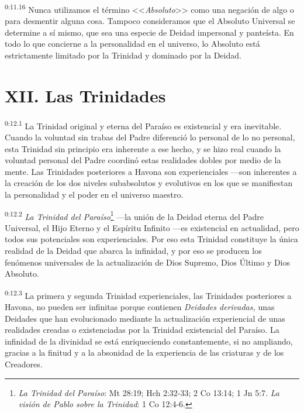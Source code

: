 \par
\textsuperscript{0:11.16} Nunca utilizamos el término <<\textit{Absoluto}>> como una negación de algo o para desmentir alguna cosa. Tampoco consideramos que el Absoluto Universal se determine a sí mismo, que sea una especie de Deidad impersonal y panteísta. En todo lo que concierne a la personalidad en el universo, lo Absoluto está estrictamente limitado por la Trinidad y dominado por la Deidad.

\section*{XII. Las Trinidades}
\par
\textsuperscript{0:12.1} La Trinidad original y eterna del Paraíso es existencial y era inevitable. Cuando la voluntad sin trabas del Padre diferenció lo personal de lo no personal, esta Trinidad sin principio era inherente a ese hecho, y se hizo real cuando la voluntad personal del Padre coordinó estas realidades dobles por medio de la mente. Las Trinidades posteriores a Havona son experienciales ---son inherentes a la creación de los dos niveles subabsolutos y evolutivos en los que se manifiestan la personalidad y el poder en el universo maestro.

\par
\textsuperscript{0:12.2} \textit{La Trinidad del Paraíso}\footnote{\textit{La Trinidad del Paraíso}: Mt 28:19; Hch 2:32-33; 2 Co 13:14; 1 Jn 5:7. \textit{La visión de Pablo sobre la Trinidad}: 1 Co 12:4-6.} ---la unión de la Deidad eterna del Padre Universal, el Hijo Eterno y el Espíritu Infinito ---es existencial en actualidad, pero todos sus potenciales son experienciales. Por eso esta Trinidad constituye la única realidad de la Deidad que abarca la infinidad, y por eso se producen los fenómenos universales de la actualización de Dios Supremo, Dios Último y Dios Absoluto.

\par
\textsuperscript{0:12.3} La primera y segunda Trinidad experienciales, las Trinidades posteriores a Havona, no pueden ser infinitas porque contienen \textit{Deidades derivadas,} unas Deidades que han evolucionado mediante la actualización experiencial de unas realidades creadas o existenciadas por la Trinidad existencial del Paraíso. La infinidad de la divinidad se está enriqueciendo constantemente, si no ampliando, gracias a la finitud y a la absonidad de la experiencia de las criaturas y de los Creadores.

